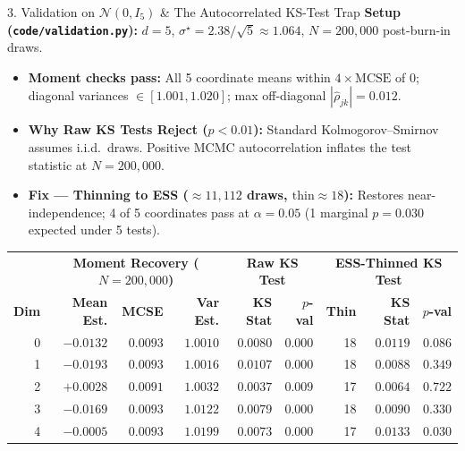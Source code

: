 \documentclass[aspectratio=169, 10pt]{beamer}
\begin{document}
\begin{frame}{3. Validation on $\mathcal{N}(0, I_5)$ \& The Autocorrelated KS-Test Trap}
  \textbf{Setup (\texttt{code/validation.py}):} $d=5$, $\sigma^\star = 2.38/\sqrt{5} \approx 1.064$, $N = 200,000$ post-burn-in draws.
  \begin{itemize}
    \item \textbf{Moment checks pass:} All 5 coordinate means within $4\times\mathrm{MCSE}$ of $0$; diagonal variances $\in [1.001, 1.020]$; max off-diagonal $|\hat{\rho}_{jk}| = 0.012$.
    \item \textbf{Why Raw KS Tests Reject ($p < 0.01$):} Standard Kolmogorov--Smirnov assumes i.i.d.\ draws. Positive MCMC autocorrelation inflates the test statistic at $N=200,000$.
    \item \textbf{Fix — Thinning to ESS ($\approx 11,112$ draws, $\text{thin} \approx 18$):} Restores near-independence; 4 of 5 coordinates pass at $\alpha = 0.05$ (1 marginal $p=0.030$ expected under 5 tests).
  \end{itemize}

  \vspace{0.2em}
  \centering
  \footnotesize
  \begin{tabular}{rrrr|rr|rrr}
    \toprule
    & \multicolumn{3}{c|}{\textbf{Moment Recovery ($N=200,000$)}} & \multicolumn{2}{c|}{\textbf{Raw KS Test}} & \multicolumn{3}{c}{\textbf{ESS-Thinned KS Test}} \\
    \textbf{Dim} & \textbf{Mean Est.} & \textbf{MCSE} & \textbf{Var Est.} & \textbf{KS Stat} & \textbf{$p$-val} & \textbf{Thin} & \textbf{KS Stat} & \textbf{$p$-val} \\
    \midrule
    0 & $-0.0132$ & $0.0093$ & $1.0010$ & $0.0080$ & $0.000$ & 18 & $0.0119$ & $0.086$ \\
    1 & $-0.0193$ & $0.0093$ & $1.0016$ & $0.0107$ & $0.000$ & 18 & $0.0088$ & $0.349$ \\
    2 & $+0.0028$ & $0.0091$ & $1.0032$ & $0.0037$ & $0.009$ & 17 & $0.0064$ & $0.722$ \\
    3 & $-0.0169$ & $0.0093$ & $1.0122$ & $0.0079$ & $0.000$ & 18 & $0.0090$ & $0.330$ \\
    4 & $-0.0005$ & $0.0093$ & $1.0199$ & $0.0073$ & $0.000$ & 17 & $0.0133$ & $0.030$ \\
    \bottomrule
  \end{tabular}
\end{frame}
\end{document}
